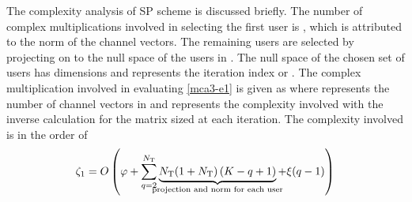 The complexity analysis of \ac{SP} scheme is discussed briefly. The number of complex multiplications involved in selecting the first user is , which is attributed to the norm of the channel vectors. The remaining users are selected by projecting on to the null space of the users in . The null space of the chosen set of users has  dimensions and  represents the iteration index or . The complex multiplication involved in evaluating \eqref{mca3-e1} is given as  where  represents the number of channel vectors in  and  represents the complexity involved with the inverse calculation for the matrix sized  at each iteration. The complexity involved is in the order of
\begin{eqnarray*}
\zeta_1 = O \left ( \varphi + \sum^{N_\mrm{T}}_{q = 2} \underbrace{N_\mrm{T}(1 + N_\mrm{T}) \, (K - q + 1)}_{\mathclap{\text{projection and norm for each user}}} + \xi(q - 1) \right )
\end{eqnarray*}
